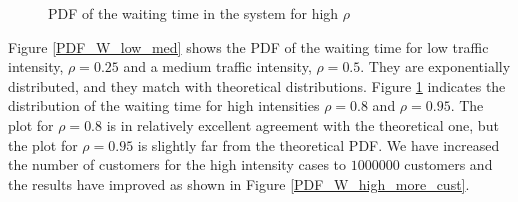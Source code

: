 \documentclass[12pt, a4paper]{article}
\begin{document}
\begin{figure}[H]
  \centering
  \hspace{0px}
  \caption{PDF of the waiting time in the system for high $\rho$}  
  \label{PDF_W_high}
\end{figure}

Figure \ref{PDF_W_low_med} shows the PDF of the waiting time for low traffic intensity, $\rho=0.25$
and a medium traffic intensity, $\rho=0.5$. They are exponentially distributed, and they match with
theoretical distributions. Figure \ref{PDF_W_high} indicates the distribution of the waiting time
for high intensities $\rho =0.8$ and $\rho=0.95$. The plot for $\rho=0.8$ is in relatively excellent 
agreement with the theoretical one, but the plot for $\rho =0.95$ is slightly far from the theoretical 
PDF. We have increased the number of customers for the high intensity cases to $1000000$ customers
and the results have improved as shown in Figure \ref{PDF_W_high_more_cust}.
\end{document}
